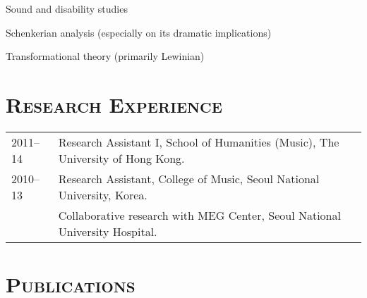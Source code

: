 \documentclass[a4paper,11pt]{article}
\begin{document}
  \noindent \hspace{2mm} \textbullet \hspace{2mm} Sound and disability studies
  
  \noindent \hspace{2mm} \textbullet \hspace{2mm} Schenkerian analysis (especially on its dramatic implications)
  
  \noindent \hspace{2mm} \textbullet \hspace{2mm} Transformational theory (primarily Lewinian)
  
  \section*{\textsc{Research Experience}}
  
  \hspace*{-0.25cm}
  \begin{tabular}{p{2.5cm} l}
    2011--14 & Research Assistant I, School of Humanities (Music), The University of Hong Kong.\\
    
    2010--13 & Research Assistant, College of Music, Seoul National University, Korea.\\
    & Collaborative research with MEG Center, Seoul National University Hospital.
  \end{tabular}
  
  \vspace*{2.5mm}
  
  \section*{\textsc{Publications}}
\end{document}
